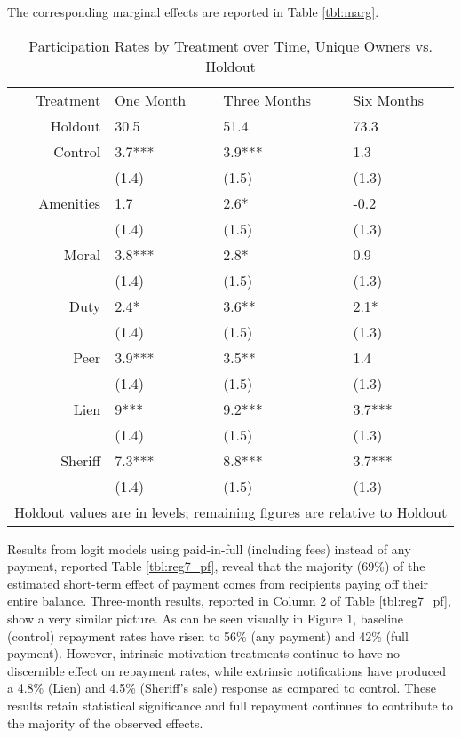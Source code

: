 \documentclass[12pt,titlepage]{article}
\begin{document}
The corresponding marginal effects are reported in Table \ref{tbl:marg}.

\begin{table}[ht]
\centering
\caption{Participation Rates by Treatment over Time, Unique Owners vs. Holdout} 
\label{tbl:marg_ep}
\begin{tabular}{rlll}
  \hline
Treatment & One Month & Three Months & Six Months \\ 
 Holdout & 30.5 & 51.4 & 73.3 \\ 
   \hline
Control & 3.7*** & 3.9*** & 1.3 \\ 
   & (1.4) & (1.5) & (1.3) \\ 
  Amenities & 1.7 & 2.6* & -0.2 \\ 
   & (1.4) & (1.5) & (1.3) \\ 
  Moral & 3.8*** & 2.8* & 0.9 \\ 
   & (1.4) & (1.5) & (1.3) \\ 
  Duty & 2.4* & 3.6** & 2.1* \\ 
   & (1.4) & (1.5) & (1.3) \\ 
  Peer & 3.9*** & 3.5** & 1.4 \\ 
   & (1.4) & (1.5) & (1.3) \\ 
  Lien & 9*** & 9.2*** & 3.7*** \\ 
   & (1.4) & (1.5) & (1.3) \\ 
  Sheriff & 7.3*** & 8.8*** & 3.7*** \\ 
   & (1.4) & (1.5) & (1.3) \\ 
   
 \hline 
 \multicolumn{4}{l}{\scriptsize{Holdout values are in levels; remaining figures are relative to Holdout}} \\ 
\end{tabular}
\end{table}

Results from logit models using 
paid-in-full (including fees) instead of any payment, reported Table 
\ref{tbl:reg7_pf}, reveal that the majority (69\%) of the estimated 
short-term effect of payment comes from recipients paying off their entire balance.
Three-month results, reported in Column 2 of Table \ref{tbl:reg7_pf}, show a very 
similar picture. As can be seen visually in Figure 1, baseline (control) 
repayment rates have risen to 56\% (any payment) and 42\% (full payment). 
However, intrinsic motivation treatments continue to have no discernible 
effect on repayment rates, while extrinsic notifications have produced a 
4.8\% (Lien) and 4.5\% (Sheriff's sale) response as compared to control. These 
results retain statistical significance and full repayment continues to 
contribute to the majority of the observed effects.
\end{document}
